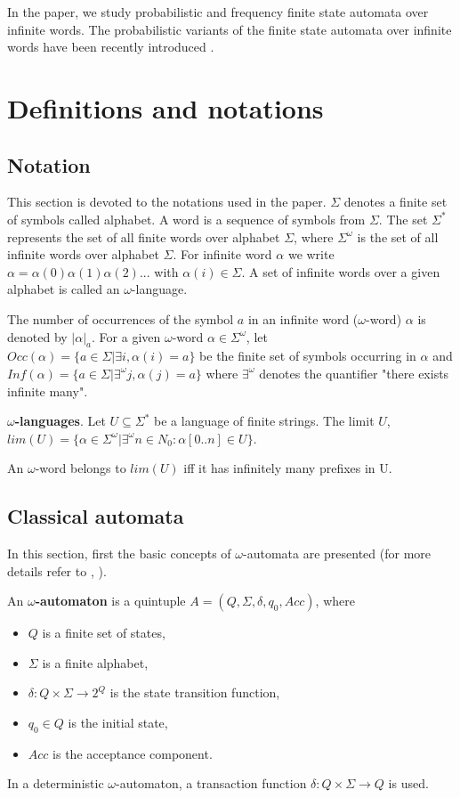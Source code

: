 \documentclass{llncs}
\begin{document}
In the paper, we study probabilistic and frequency finite state automata over infinite words. The probabilistic variants of the finite state automata over infinite words have been recently introduced \cite{BG05}.

\section{Definitions and notations}
%
\subsection{Notation}
%
This section is devoted to the notations used in the paper. $\Sigma$ denotes a finite set of symbols called alphabet. A word is a sequence of symbols from $\Sigma$. The set $\Sigma^{*}$ represents the set of all finite words over alphabet $\Sigma$, where $\Sigma^{\omega}$ is the set of all infinite words over alphabet $\Sigma$. For infinite word $\alpha$ we write $\alpha = \alpha(0) \alpha(1) \alpha(2)...$ with $\alpha(i) \in \Sigma$. A set of infinite words over a given alphabet is called an $\omega$-language.

The number of occurrences of the symbol $a$ in an infinite word ($\omega$-word) $\alpha$ is denoted by $|\alpha|_a$. For a given $\omega$-word $\alpha \in \Sigma^{\omega}$, let $Occ(\alpha)=\{a \in \Sigma | \exists i, \alpha(i) = a\}$ be the finite set of symbols occurring in $\alpha$ and $Inf(\alpha) = \{ a \in \Sigma | \exists^\omega j, \alpha(j) = a\}$  where $\exists^\omega$ denotes the quantifier "there exists infinite many".
%
\begin{definition}
\textbf{$\omega$-languages}. Let $U \subseteq \Sigma^{*}$ be a language of finite strings. The limit $U$, $lim(U) = \{\alpha \in \Sigma^{\omega} | \exists^{\omega} n \in N_0: \alpha[0..n] \in U\}$.
\end{definition}

An $\omega $-word belongs to $lim(U)$ iff it has infinitely many prefixes in U.
%
\subsection{Classical  automata}
%
In this section, first the basic concepts of $\omega$-automata are presented (for more details refer to \cite{SP02}, \cite{T97}).
%
\begin{definition}
An \textbf{$\omega$-automaton} is a quintuple $A = (Q, \Sigma, \delta, q_0, Acc)$, where
\begin{itemize}
\item $Q$ is a finite set of states,
\item $\Sigma$ is a finite alphabet,
\item $\delta : Q \times \Sigma \rightarrow 2^{Q}$ is the state transition function,
\item $q_0 \in Q$ is the initial state,
\item $Acc$ is the acceptance component. 
\end{itemize}
In a deterministic $\omega$-automaton, a transaction function $\delta : Q \times \Sigma \rightarrow Q$ is used.
\end{definition}
\end{document}
